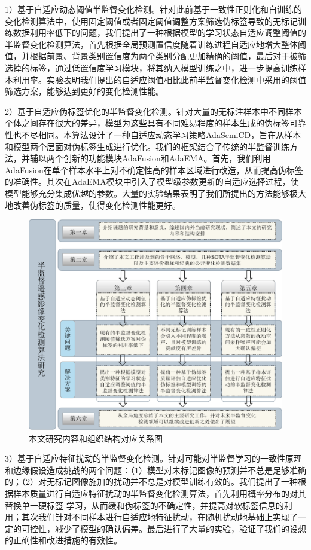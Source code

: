 \documentclass[lang=chs, degree=master, blindreview=false, adobe=false]{yanputhesis}
\begin{document}
1）基于自适应动态阈值半监督变化检测。针对此前基于一致性正则化和自训练的变化检测算法中，使用固定阈值或者固定阈值调整方案筛选伪标签导致的无标记训练数据利用率低下的问题，我们提出了一种根据模型的学习状态自适应调整阈值的半监督变化检测算法，首先根据全局预测置信度随着训练进程自适应地增大整体阈值，并根据前景、背景类别置信度为两个类别分配更加精确的阈值，最后对于被筛选掉的标签，通过低置信度学习模块，将其纳入模型训练之中，进一步提高训练样本利用率。实验表明我们提出的自适应阈值相比此前半监督变化检测中采用的阈值筛选方案，能够达到更好的变化检测性能。

2）基于自适应伪标签优化的半监督变化检测。针对大量的无标注样本中不同样本个体之间存在很大的差异，模型为这些具有不同难易程度的样本生成的伪标签可靠性也不尽相同。本算法设计了一种自适应动态学习策略AdaSemiCD，旨在从样本和模型两个层面对伪标签生成进行优化。我们的框架结合了传统的半监督训练方法，并辅以两个创新的功能模块AdaFusion和AdaEMA。首先，我们利用AdaFusion在单个样本水平上对不确定性高的样本区域进行改造，从而提高伪标签的准确性。其次在AdaEMA模块中引入了模型级参数更新的自适应选择过程，使模型能够充分集成优越的参数。大量的实验结果表明了我们所提出的方法能够极大地改善伪标签的质量，使得变化检测性能更好。
\begin{figure}[H]
  \centering
  \includegraphics[scale=0.75]{images/paper_frame.png}
  \caption{
    本文研究内容和组织结构对应关系图
  }
  \label{fig:paper_frame}
\end{figure}

3）基于自适应特征扰动的半监督变化检测。针对可能对半监督学习的一致性原理和边缘假设造成挑战的两个问题：（1）模型对未标记图像的预测并不总是足够准确的；（2）对无标记图像施加的扰动并不总是对模型训练有效的。我们提出了一种根据样本质量进行自适应特征扰动的半监督变化检测算法，首先利用概率分布的对其替换单一硬标签
学习，从而缓和伪标签的不确定性，并提高对软标签信息的利用；其次我们针对不同样本进行自适应地特征扰动，在随机扰动地基础上实现了一定的可控性，减少了模型的确认偏差。最后进行了大量的实验，验证了我们的设想的正确性和改进措施的有效性。
\end{document}
